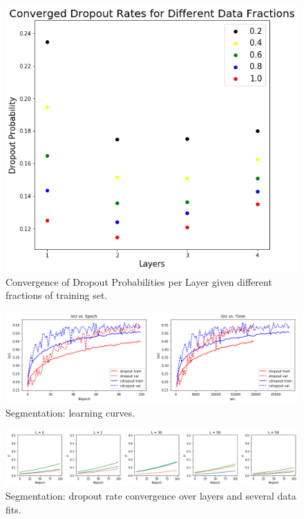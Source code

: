 \documentclass{article}
\begin{document}
\begin{figure}[!h]
\centering
\centering
\includegraphics[width=0.5\linewidth]{dropout_fractions.png}
\caption{Convergence of Dropout Probabilities per Layer given different fractions of training set.}
\label{fig:mnist_frac}
\end{figure}



\begin{figure}[!h]
\centering
\centering
\includegraphics[width=0.7\linewidth]{time_iou_comparison.png}
\caption{Segmentation: learning curves.}
\label{fig:segcurve}
\end{figure}

\begin{figure}[!h]
\centering
\centering
\includegraphics[width=\linewidth]{dropout_rate_convergence.png}
\caption{Segmentation: dropout rate convergence over layers and several data fits.}
\label{fig:segconv}
\end{figure}
\end{document}
